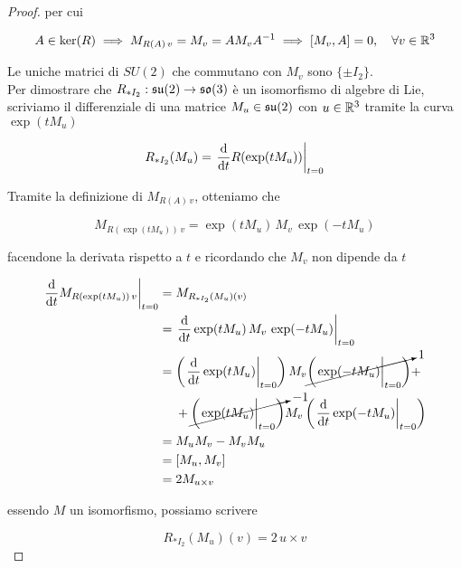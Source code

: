 \begin{proof}
	per cui
	
	\begin{equation}
		A \in \ker(R) \implies M_{R(A) \, v} = M_{v} = A M_{v} A^{-1} \implies [M_{v},A] = 0 \qcomma \forall v \in \R^{3}
	\end{equation}

	Le uniche matrici di $ SU(2) $ che commutano con $ M_{v} $ sono $ \{ \pm I_{2} \} $.\\
	Per dimostrare che $ R_{*I_{2}} : \mathfrak{su}(2) \to \mathfrak{so}(3) $ è un isomorfismo di algebre di Lie, scriviamo il differenziale di una matrice $ M_{u} \in \mathfrak{su}(2) $ con $ u \in \mathbb{R}^{3} $ tramite la curva $ \exp(t M_{u}) $
	
	\begin{equation}
			R_{*I_{2}}(M_{u}) = \eval{ \dv{t} R( \exp(t M_{u}) ) }_{t=0}
	\end{equation}
	
	Tramite la definizione di $ M_{R(A) \, v} $, otteniamo che
	
	\begin{equation}
		M_{R(\exp(t M_{u})) \, v} = \exp(t M_{u}) \, M_{v} \, \exp(-t M_{u})
	\end{equation}
	
	facendone la derivata rispetto a $ t $ e ricordando che $ M_{v} $ non dipende da $ t $
	
	\begin{align}
		\begin{split}
			\eval{ \dv{t} M_{R(\exp(t M_{u})) \, v} }_{t=0} &= M_{R_{*I_{2}}(M_{u}) (v)}\\
			&= \eval{ \dv{t} \exp(t M_{u}) \, M_{v} \, \exp(-t M_{u}) }_{t=0}\\
			&= \left( \eval{ \dv{t} \exp(t M_{u}) }_{t=0} \right) M_{v} \cancelto{1}{ \left( \eval{ \exp(-t M_{u}) }_{t=0} \right) } +\\
			& \hspace{13px} + \cancelto{-1}{ \left( \eval{ \exp(t M_{u}) }_{t=0} \right) } M_{v} \left( \eval{ \dv{t} \exp(-t M_{u}) }_{t=0} \right)\\
			&= M_{u} M_{v} - M_{v} M_{u}\\
			&= [M_{u},M_{v}]\\
			&= 2 M_{u \times v}
		\end{split}
	\end{align}
	
	essendo $ M $ un isomorfismo, possiamo scrivere
	
	\begin{equation}
		R_{*I_{2}}(M_{u}) (v) = 2 \, u \times v
	\end{equation}
	

\end{proof}
